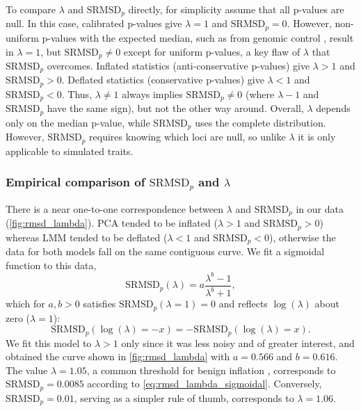 \documentclass[11pt]{article}
\newcommand{\rmsd}{\text{SRMSD}_p}
\begin{document}
To compare $\lambda$ and $\rmsd$ directly, for simplicity assume that all p-values are null.
In this case, calibrated p-values give $\lambda = 1$ and $\rmsd = 0$.
However, non-uniform p-values with the expected median, such as from genomic control \citep{devlin_genomic_1999}, result in $\lambda = 1$, but $\rmsd \ne 0$ except for uniform p-values, a key flaw of $\lambda$ that $\rmsd$ overcomes.
Inflated statistics (anti-conservative p-values) give $\lambda > 1$ and $\rmsd > 0$.
Deflated statistics (conservative p-values) give $\lambda < 1$ and $\rmsd < 0$.
Thus, $\lambda \ne 1$ always implies $\rmsd \ne 0$ (where $\lambda - 1$ and $\rmsd$ have the same sign), but not the other way around.
Overall, $\lambda$ depends only on the median p-value, while $\rmsd$ uses the complete distribution.
However, $\rmsd$ requires knowing which loci are null, so unlike $\lambda$ it is only applicable to simulated traits.

\subsubsection{Empirical comparison of $\rmsd$ and $\lambda$}

There is a near one-to-one correspondence between $\lambda$ and $\rmsd$ in our data (\cref{fig:rmsd_lambda}).
PCA tended to be inflated ($\lambda > 1$ and $\rmsd > 0$) whereas LMM tended to be deflated ($\lambda < 1$ and $\rmsd < 0$), otherwise the data for both models fall on the same contiguous curve.
We fit a sigmoidal function to this data,
\begin{equation}
  \label{eq:rmsd_lambda_sigmoidal}
  \rmsd( \lambda ) = a \frac{ \lambda^b - 1 }{ \lambda^b + 1 },
\end{equation}
which for $a,b > 0$ satisfies $\rmsd( \lambda = 1 ) = 0$ and reflects $\log( \lambda )$ about zero ($\lambda = 1$):
$$
\rmsd( \log( \lambda ) = -x ) = - \rmsd( \log( \lambda ) = x ).
$$
We fit this model to $\lambda > 1$ only since it was less noisy and of greater interest, and obtained the curve shown in \cref{fig:rmsd_lambda} with $a = 0.566$ and $b = 0.616$.
The value $\lambda = 1.05$, a common threshold for benign inflation \citep{price_new_2010}, corresponds to $\rmsd = 0.0085$ according to \cref{eq:rmsd_lambda_sigmoidal}.
Conversely, $\rmsd = 0.01$, serving as a simpler rule of thumb, corresponds to $\lambda = 1.06$.
\end{document}
